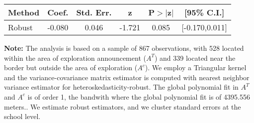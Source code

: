 \begin{table}[htbp]\centering
 \footnotesize 
\begin{tabular}{lccccc}
\hline\hline
Method & Coef. & Std. Err. & z & P$>|$z$|$ & [95\% C.I.] \\ 
\hline \hline  
Robust & -0.080 & 0.046 & -1.721 & 0.085 & [-0.170,0.011] \\ 
  \hline\hline
\end{tabular}
\label{table:rd}
\begin{tablenotes} 
  \justifying \tiny \textbf{Note: }    
   The analysis is based on a sample of 867 observations, with 528 located within the area of exploration announcement ($A^{T}$) and 339 located near the border but outside the area of exploration  ($A^{c}$). 
           We employ a Triangular kernel and the variance-covariance matrix estimator is computed with nearest neighbor variance estimator for heteroskedasticity-robust. The global polynomial fit in  $A^{T}$ and $A^{c}$ is of order 1, the bandwith where the global polynomial fit is of 4395.556 meters.. We estimate robust estimators, and we cluster standard errors at the school level. \end{tablenotes} 
 \end{table} 
